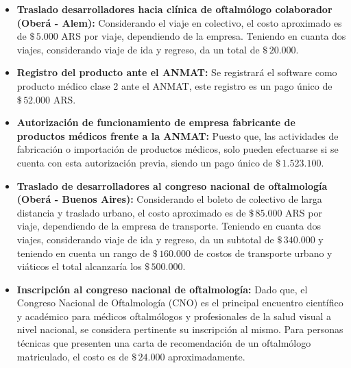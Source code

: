             \begin{itemize}
                \item \textbf{Traslado desarrolladores hacia clínica de oftalmólogo colaborador (Oberá - Alem):} Considerando el viaje en colectivo, el costo aproximado es de $\$\,5.000$ ARS por viaje, dependiendo de la empresa. Teniendo en cuanta dos viajes, considerando viaje de ida y regreso, da un total de $\$\,20.000$.
    
                \item \textbf{Registro del producto ante el ANMAT:} Se registrará el software como producto médico clase 2 ante el ANMAT, este registro es un pago único de $\$\,52.000$ ARS.
    
                \item \textbf{Autorización de funcionamiento de empresa fabricante de productos médicos frente a la ANMAT:} Puesto que, las actividades de fabricación o importación de productos médicos, solo pueden efectuarse si se cuenta con esta autorización previa, siendo un pago único de $\$\,1.523.100$.
    
                \item \textbf{Traslado de desarrolladores al congreso nacional de oftalmología (Oberá - Buenos Aires):} Considerando el boleto de colectivo de larga distancia y traslado urbano, el costo aproximado es de $\$\,85.000$ ARS por viaje, dependiendo de la empresa de transporte. Teniendo en cuanta dos viajes, considerando viaje de ida y regreso, da un subtotal de $\$\,340.000$ y teniendo en cuenta un rango de $\$\,160.000$ de costos de transporte urbano y viáticos el total alcanzaría los $\$\,500.000$.
    
                \item \textbf{Inscripción al congreso nacional de oftalmología:} Dado que, el Congreso Nacional de Oftalmología (CNO) es el principal encuentro científico y académico para médicos oftalmólogos y profesionales de la salud visual a nivel nacional, se considera pertinente su inscripción al mismo. Para personas técnicas que presenten una carta de recomendación de un oftalmólogo matriculado, el costo es de $\$\,24.000$ aproximadamente.
            \end{itemize}

